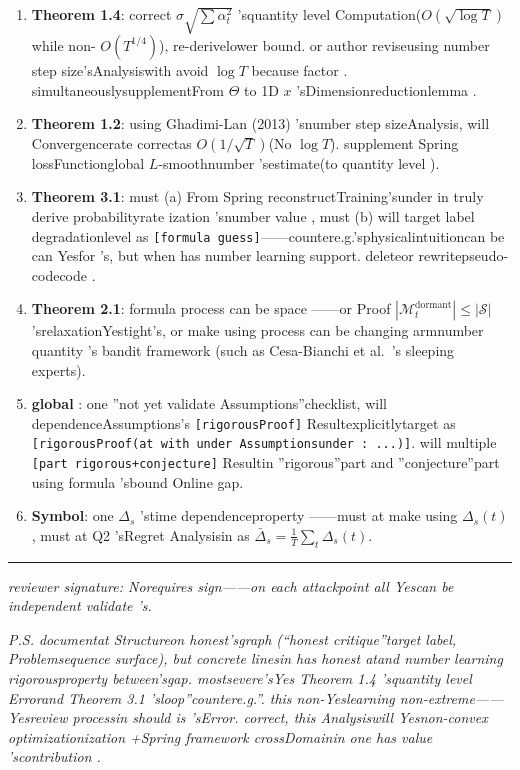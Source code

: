 \documentclass[
  12pt,
]{article}
\begin{document}
\begin{enumerate}
\def\labelenumi{\arabic{enumi}.}
\item
  \textbf{Theorem 1.4}: correct \(\sigma\sqrt{\sum\alpha_t^2}\)
  'squantity level Computation(\(O(\sqrt{\log T})\) while non-
  \(O(T^{1/4})\)), re-derivelower bound. or author reviseusing number step size'sAnalysiswith avoid
  \(\log T\) because factor . simultaneouslysupplementFrom \(\Theta\) to  1D \(x\)
  'sDimensionreductionlemma . 
\item
  \textbf{Theorem 1.2}: using  Ghadimi-Lan (2013)
  'snumber step sizeAnalysis, will Convergencerate correctas  \(O(1/\sqrt{T})\)(No
  \(\log T\)). supplement Spring lossFunctionglobal 
  \(L\)-smoothnumber 'sestimate(to quantity level ). 
\item
  \textbf{Theorem 3.1}: must  (a) From Spring
  reconstructTraining'sunder in truly derive probabilityrate ization 'snumber value , must  (b) will target label degradationlevel as 
  \texttt{{[}formula guess{]}}------countere.g.'sphysicalintuitioncan be can Yesfor 's, but when has number learning support. deleteor rewritepseudo-codecode . 
\item
  \textbf{Theorem 2.1}: formula process can be space ------or Proof
  \(|\mathcal{M}_t^{\text{dormant}}| \leq |\mathcal{S}|\)
  'srelaxationYestight's, or make using process can be changing armnumber quantity 's bandit framework (such as  Cesa-Bianchi et
  al.~'s sleeping experts). 
\item
  \textbf{global }: one ''not yet validate Assumptions''checklist, will dependenceAssumptions's
  \texttt{{[}rigorousProof{]}} Resultexplicitlytarget as 
  \texttt{{[}rigorousProof(at with under Assumptionsunder : ...){]}}. will multiple 
  \texttt{{[}part rigorous+conjecture{]}}
  Resultin ''rigorous''part and ''conjecture''part using formula 'sbound Online gap. 
\item
  \textbf{Symbol}: one  \(\Delta_s\) 'stime dependenceproperty ------must at make using 
  \(\Delta_s(t)\), must at  Q2 'sRegret Analysisin as 
  \(\bar{\Delta}_s = \frac{1}{T}\sum_t \Delta_s(t)\). 
\end{enumerate}

\begin{center}\rule{0.5\linewidth}{0.5pt}\end{center}

\emph{reviewer signature: Norequires sign------on each attackpoint all Yescan be independent validate 's. }

\emph{P.S.
documentat Structureon honest'sgraph (``honest critique''target label, Problemsequence surface), but concrete linesin has honest atand number learning rigorousproperty between'sgap. mostsevere'sYes
Theorem 1.4 'squantity level Errorand  Theorem 3.1
'sloop''countere.g.''. this non-Yeslearning non-extreme------Yesreview processin should is 'sError. correct, this Analysiswill Yesnon-convex optimizationization +Spring
framework crossDomainin one has value 'scontribution . }
\end{document}

